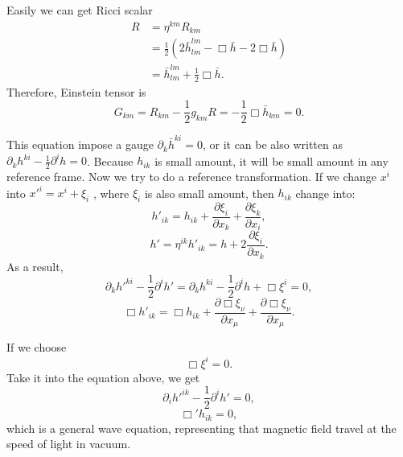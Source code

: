 \documentclass[openany,10pt]{book}
\theoremstyle{definition}
\theoremstyle{definition}
\theoremstyle{remark}
\begin{document}
Easily we can get Ricci scalar
\begin{equation}
\begin{aligned}
R&=\eta^{km}R_{km}\\
   &=\frac{1}{2}(2\bar{h}^{lm}_{lm}-\Box\bar{h}-2\Box\bar{h})\\
   &=\bar{h}^{lm}_{lm}+\frac{1}{2}\Box\bar{h}.
\end{aligned}
\end{equation}
Therefore, Einstein tensor is 
\begin{equation}
G_{km}=R_{km}-\frac{1}{2}g_{km}R=-\frac{1}{2}\Box\bar{h}_{km}=0.
\end{equation}


This equation impose a gauge $\partial_k\bar{h}^{ki}=0$, or it can be also written as $\partial _kh^{ki}-\frac{1}{2}\partial^ih=0$. Because $h_{ik}$ is small amount, it will be small amount in any reference frame. Now we try to do a reference transformation. If we change $x^i$ into $x'^i=x^i+\xi_i$ , where $\xi_i$ is also small amount, then $h_{ik}$ change into:
\begin{equation}
h'_{ik}=h_{ik}+\frac{\partial\xi_i}{\partial x_k}+\frac{\partial \xi_k}{\partial x_i},
\end{equation}
\begin{equation}
h'=\eta^{ik}h'_{ik}=h+2\frac{\partial\xi_i}{\partial x_k}.
\end{equation}
As a result, 
\begin{equation}
\partial_kh'^{ki}-\frac{1}{2}\partial^ih'=\partial_kh^{ki}-\frac{1}{2}\partial^ih+\Box\xi^i=0,
\end{equation}
\begin{equation}
\Box h'_{ik}=\Box h_{ik}+\frac{\partial\Box\xi_\nu}{\partial x_\mu}+\frac{\partial \Box\xi_\nu}{\partial x_\mu}.
\end{equation}

If we choose
\begin{equation}
\Box\xi^i=0.
\end{equation}
Take it into the equation above, we get 
\begin{equation}
\partial_ih'^{ik}-\frac{1}{2}\partial^ih'=0,
\end{equation}
\begin{equation}
    \boxed{\Box'{h}_{ik}=0,}
\end{equation}
which is a general wave equation, representing that magnetic field travel at the speed of light in vacuum. 
\end{document}
